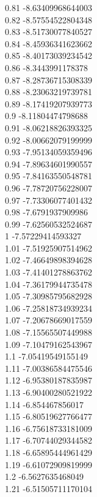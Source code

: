 {0.81	-8.63409968644003\\
0.82	-8.57554522804348\\
0.83	-8.51730077840527\\
0.84	-8.45936341623662\\
0.85	-8.40173039234542\\
0.86	-8.3443991178378\\
0.87	-8.28736715308339\\
0.88	-8.23063219739781\\
0.89	-8.17419207939773\\
0.9	-8.11804474798688\\
0.91	-8.06218826393325\\
0.92	-8.00662079199999\\
0.93	-7.95134059359496\\
0.94	-7.89634601990557\\
0.95	-7.84163550548781\\
0.96	-7.78720756228007\\
0.97	-7.73306077401432\\
0.98	-7.6791937909986\\
0.99	-7.62560532524687\\
1	-7.57229414593327\\
1.01	-7.51925907514962\\
1.02	-7.46649898394628\\
1.03	-7.41401278863762\\
1.04	-7.36179944735478\\
1.05	-7.30985795682928\\
1.06	-7.25818734939234\\
1.07	-7.20678669017559\\
1.08	-7.15565507449988\\
1.09	-7.10479162543967\\
1.1	-7.05419549155149\\
1.11	-7.00386584475546\\
1.12	-6.95380187835987\\
1.13	-6.90400280521922\\
1.14	-6.854467856017\\
1.15	-6.80519627766477\\
1.16	-6.75618733181009\\
1.17	-6.70744029344582\\
1.18	-6.65895444961429\\
1.19	-6.61072909819999\\
1.2	-6.5627635468049\\
1.21	-6.51505711170104\\
}
